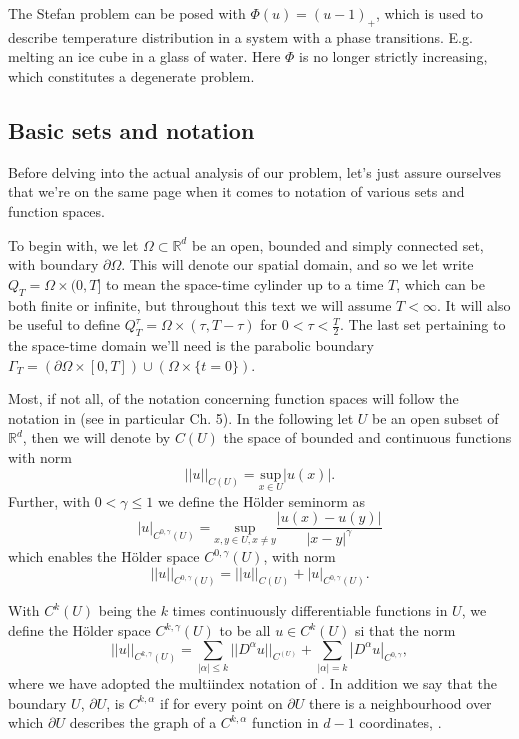 \documentclass[11pt, a4paper]{article}
\begin{document}
\begin{example}
The Stefan problem can be posed with $\Phi(u) = (u-1)_+$, which is used to describe temperature distribution in a system with a phase transitions. E.g. melting an ice cube in a glass of water. Here $\Phi$ is no longer strictly increasing, which constitutes a degenerate problem.
\end{example}

\subsection{Basic sets and notation}
Before delving into the actual analysis of our problem, let's just assure ourselves that we're on the same page when it comes to notation of various sets and function spaces.

To begin with, we let $\Omega \subset \mathbb{R}^d$ be an open, bounded and simply connected set, with boundary $\partial \Omega$. This will denote our spatial domain, and so we let write $Q_T = \Omega \times (0,T]$ to mean the space-time cylinder up to a time $T$, which can be both finite or infinite, but throughout this text we will assume $T < \infty$. It will also be useful to define $Q_T^\tau = \Omega \times (\tau, T-\tau)$ for $0<\tau < \frac{T}{2}$. The last set pertaining to the space-time domain we'll need is the parabolic boundary $\Gamma_T = (\partial \Omega \times [0,T]) \cup (\Omega\times \{t=0\})$.


Most, if not all, of the notation concerning function spaces will follow the notation in \citep{evans} (see in particular Ch. 5). In the following let $U$ be an open subset of $\mathbb{R}^d$, then we will denote by $C(U)$ the space of bounded and continuous functions with norm
\begin{equation*}
||u||_{C(U)} = \underset{x \in U}{\mathrm{sup}}|u(x)|.
\end{equation*}
Further, with $0< \gamma \leq 1$ we define the Hölder seminorm as
\begin{equation*}
|u|_{C^{0,\gamma}(U)} = \underset{x,y \in U, x\neq y}{\mathrm{sup}}\frac{|u(x)-u(y)|}{|x-y|^\gamma}
\end{equation*}
which enables the Hölder space $C^{0,\gamma}(U)$, with norm
\begin{equation*}
||u||_{C^{0,\gamma}(U)} = ||u||_{C(U)} + |u|_{C^{0,\gamma}(U)}.
\end{equation*}

With $C^k(U)$ being the $k$ times continuously differentiable functions in $U$, we define the Hölder space $C^{k,\gamma}(U)$ to be all $u \in C^{k}(U)$ si that the norm
\begin{equation*}
||u||_{C^{k,\gamma}(U)} = \sum_{|\alpha| \leq k} ||D^\alpha u||_{C^(U)} + \sum_{|\alpha| = k} |D^\alpha u |_{C^{0,\gamma}},
\end{equation*}
where we have adopted the multiindex notation of \citep{evans}. In addition we say that the boundary $U$, $\partial U$, is $C^{k, \alpha}$ if for every point on $\partial U$ there is a neighbourhood over which $\partial U$ describes the graph of a $C^{k,\alpha}$ function in $d-1$ coordinates, \citep{gilbarg2001elliptic}.
\end{document}
